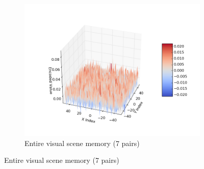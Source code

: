 \documentclass[a4paper,twoside]{article}
\begin{document}
\begin{figure}[th!]
		\begin{subfigure}{0.8\columnwidth}
			\center
			\includegraphics[width=0.8\linewidth]{img/coord_example_3.png}
			\caption{Entire  visual scene memory (7 pairs)}
			\label{fig:encoding-scene}
		\end{subfigure}
		

\end{figure}
\end{document}
